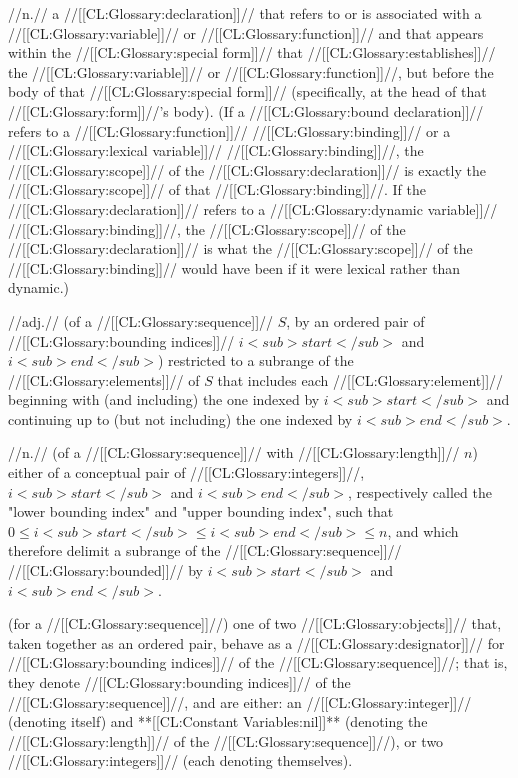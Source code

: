  //n.// a //[[CL:Glossary:declaration]]// that refers to or is associated with a //[[CL:Glossary:variable]]// or //[[CL:Glossary:function]]// and that appears within the //[[CL:Glossary:special form]]// that //[[CL:Glossary:establishes]]// the //[[CL:Glossary:variable]]// or //[[CL:Glossary:function]]//, but before the body of that //[[CL:Glossary:special form]]// (specifically, at the head of that //[[CL:Glossary:form]]//'s body). (If a //[[CL:Glossary:bound declaration]]// refers to a //[[CL:Glossary:function]]// //[[CL:Glossary:binding]]// or a //[[CL:Glossary:lexical variable]]// //[[CL:Glossary:binding]]//, the //[[CL:Glossary:scope]]// of the //[[CL:Glossary:declaration]]// is exactly the //[[CL:Glossary:scope]]// of that //[[CL:Glossary:binding]]//. If the //[[CL:Glossary:declaration]]// refers to a //[[CL:Glossary:dynamic variable]]// //[[CL:Glossary:binding]]//, the //[[CL:Glossary:scope]]// of the //[[CL:Glossary:declaration]]// is what the //[[CL:Glossary:scope]]// of the //[[CL:Glossary:binding]]// would have been if it were lexical rather than dynamic.)
 
 //adj.// (of a //[[CL:Glossary:sequence]]// $S$, by an ordered pair of //[[CL:Glossary:bounding indices]]// $i<sub>start</sub>$ and $i<sub>end</sub>$) restricted to a subrange of the //[[CL:Glossary:elements]]// of $S$ that includes each //[[CL:Glossary:element]]// beginning with (and including) the one indexed by $i<sub>start</sub>$ and continuing up to (but not including) the one indexed by $i<sub>end</sub>$.

 //n.// (of a //[[CL:Glossary:sequence]]// with //[[CL:Glossary:length]]// $n$) either of a conceptual pair of //[[CL:Glossary:integers]]//, $i<sub>start</sub>$ and $i<sub>end</sub>$, respectively called the "lower bounding index" and "upper bounding index", such that $0 \leq i<sub>start</sub> \leq i<sub>end</sub> \leq n$, and which therefore delimit a subrange of the //[[CL:Glossary:sequence]]// //[[CL:Glossary:bounded]]// by $i<sub>start</sub>$ and $i<sub>end</sub>$.

 (for a //[[CL:Glossary:sequence]]//) one of two //[[CL:Glossary:objects]]// that, taken together as an ordered pair, behave as a //[[CL:Glossary:designator]]// for //[[CL:Glossary:bounding indices]]// of the //[[CL:Glossary:sequence]]//; that is, they denote //[[CL:Glossary:bounding indices]]// of the //[[CL:Glossary:sequence]]//, and are either: an //[[CL:Glossary:integer]]// (denoting itself) and **[[CL:Constant Variables:nil]]** (denoting the //[[CL:Glossary:length]]// of the //[[CL:Glossary:sequence]]//), or two //[[CL:Glossary:integers]]// (each denoting themselves).


